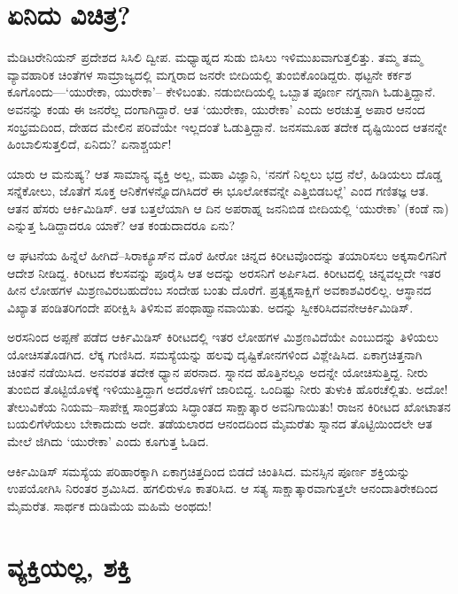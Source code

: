 \section*{ಏನಿದು ವಿಚಿತ್ರ?}


ಮೆಡಿಟರೇನಿಯನ್ ಪ್ರದೇಶದ ಸಿಸಿಲಿ ದ್ವೀಪ. ಮಧ್ಯಾಹ್ನದ ಸುಡು ಬಿಸಿಲು ಇಳಿಮುಖವಾಗುತ್ತ\-ಲಿತ್ತು. ತಮ್ಮ ತಮ್ಮ ವ್ಯಾವಹಾರಿಕ ಚಿಂತೆಗಳ ಸಾಮ್ರಾಜ್ಯದಲ್ಲಿ ಮಗ್ನರಾದ ಜನರೇ ಬೀದಿಯಲ್ಲಿ ತುಂಬಿ\-ಕೊಂಡಿದ್ದರು. ಥಟ್ಟನೇ ಕರ್ಕಶ ಕೂಗೊಂದು—‘ಯುರೇಕಾ, ಯುರೇಕಾ’– ಕೇಳಿಬಂತು. ನಡುಬೀದಿಯಲ್ಲಿ ಒಬ್ಬಾತ ಪೂರ್ಣ ನಗ್ನನಾಗಿ ಓಡುತ್ತಿದ್ದಾನೆ. ಅವನನ್ನು ಕಂಡು ಈ ಜನರೆಲ್ಲ ದಂಗಾಗಿದ್ದಾರೆ. ಆತ ‘ಯುರೇಕಾ, ಯುರೇಕಾ’ ಎಂದು ಅರಚುತ್ತ ಅಪಾರ ಆನಂದ ಸಂಭ್ರಮದಿಂದ, ದೇಹದ ಮೇಲಿನ ಪರಿವೆಯೇ ಇಲ್ಲದಂತೆ ಓಡುತ್ತಿದ್ದಾನೆ. ಜನಸಮೂಹ ತದೇಕ ದೃಷ್ಟಿಯಿಂದ ಆತನನ್ನೇ ಹಿಂಬಾಲಿಸುತ್ತಲಿದೆ, ಏನಿದು? ಏನಾಶ್ಚರ್ಯ!

ಯಾರು ಆ ಮನುಷ್ಯ? ಆತ ಸಾಮಾನ್ಯ ವ್ಯಕ್ತಿ ಅಲ್ಲ, ಮಹಾ ವಿಜ್ಞಾನಿ, ‘ನನಗೆ ನಿಲ್ಲಲು ಭದ್ರ ನೆಲೆ, ಹಿಡಿಯಲು ದೊಡ್ಡ ಸನ್ನೆಕೋಲು, ಜೊತೆಗೆ ಸೂಕ್ತ ಆನಿಕೆಗಳನ್ನೊದಗಿಸಿದರೆ ಈ ಭೂಲೋಕವನ್ನೇ ಎತ್ತಿಬಿಡಬಲ್ಲೆ’ ಎಂದ ಗಣಿತಜ್ಞ ಆತ. ಆತನ ಹೆಸರು ಆರ್ಕಿಮಿಡಿಸ್. ಆತ ಬತ್ತಲೆಯಾಗಿ ಆ ದಿನ ಅಪರಾಹ್ನ ಜನನಿಬಿಡ ಬೀದಿಯಲ್ಲಿ ‘ಯುರೇಕಾ’ (ಕಂಡೆ ನಾ) ಎನ್ನುತ್ತ ಓಡಿದ್ದಾದರೂ ಯಾಕೆ? ಆತ ಕಂಡುದಾದರೂ ಏನು?

ಆ ಘಟನೆಯ ಹಿನ್ನೆಲೆ ಹೀಗಿದೆ–ಸಿರಾಕ್ಯೂಸ್​ನ ದೊರೆ ಹೀರೋ ಚಿನ್ನದ ಕಿರೀಟವೊಂದನ್ನು ತಯಾರಿಸಲು ಅಕ್ಕಸಾಲಿಗನಿಗೆ ಆದೇಶ ನೀಡಿದ್ದ. ಕಿರೀಟದ ಕೆಲಸವನ್ನು ಪೂರೈಸಿ ಆತ ಅದನ್ನು ಅರಸನಿಗೆ ಅರ್ಪಿಸಿದ. ಕಿರೀಟದಲ್ಲಿ ಚಿನ್ನವಲ್ಲದೇ ಇತರ ಹೀನ ಲೋಹಗಳ ಮಿಶ್ರಣ\-ವಿರ\-ಬಹುದೆಂಬ ಸಂದೇಹ ಬಂತು ದೊರೆಗೆ. ಪ್ರತ್ಯಕ್ಷಸಾಕ್ಷಿಗೆ ಅವಕಾಶವಿರಲಿಲ್ಲ. ಆಸ್ಥಾನದ ವಿಖ್ಯಾತ ಪಂಡಿತರಿಗಂದೇ ಪರೀಕ್ಷಿಸಿ ತಿಳಿಸುವ ಪಂಥಾಹ್ವಾನವಾಯಿತು. ಅದನ್ನು ಸ್ವೀಕರಿಸಿದವನೇ\break ಆರ್ಕಿಮಿಡಿಸ್.

ಅರಸನಿಂದ ಅಪ್ಪಣೆ ಪಡೆದ ಆರ್ಕಿಮಿಡಿಸ್ ಕಿರೀಟದಲ್ಲಿ ಇತರ ಲೋಹಗಳ ಮಿಶ್ರಣವಿದೆಯೇ ಎಂಬುದನ್ನು ತಿಳಿಯಲು ಯೋಚಿಸತೊಡಗಿದ. ಲೆಕ್ಕ ಗುಣಿಸಿದ. ಸಮಸ್ಯೆಯನ್ನು ಹಲವು ದೃಷ್ಟಿಕೋನಗಳಿಂದ ವಿಶ್ಲೇಷಿಸಿದ. ಏಕಾಗ್ರಚಿತ್ತನಾಗಿ ಚಿಂತನೆ ನಡೆಯಿಸಿದ. ಅನವರತ ತದೇಕ ಧ್ಯಾನ ಪರನಾದ. ಸ್ನಾನದ ಹೊತ್ತಿನಲ್ಲೂ ಅದನ್ನೇ ಯೋಚಿಸುತ್ತಿದ್ದ. ನೀರು ತುಂಬಿದ ತೊಟ್ಟಿಯೊಳಕ್ಕೆ ಇಳಿಯುತ್ತಿದ್ದಾಗ ಅದರೊಳಗೆ ಜಾರಿಬಿದ್ದ. ಒಂದಿಷ್ಟು ನೀರು ತುಳುಕಿ ಹೊರಚೆಲ್ಲಿತು. ಅದೋ! ತೇಲುವಿಕೆಯ ನಿಯಮ–ಸಾಪೇಕ್ಷ ಸಾಂದ್ರತೆಯ ಸಿದ್ಧಾಂತದ ಸಾಕ್ಷಾತ್ಕಾರ ಅವನಿಗಾಯಿತು! ರಾಜನ ಕಿರೀಟದ ಖೋಟಾತನ ಬಯಲಿಗೆಳೆಯಲು ಬೇಕಾದುದು ಅದೇ. ತಡೆಯಲಾರದ ಆನಂದದಿಂದ ಮೈಮರೆತು ಸ್ನಾನದ ತೊಟ್ಟಿಯಿಂದಲೇ ಆತ ಮೇಲೆ ಜಿಗಿದು ‘ಯುರೇಕಾ’ ಎಂದು ಕೂಗುತ್ತ ಓಡಿದ.

ಆರ್ಕಿಮಿಡಿಸ್ ಸಮಸ್ಯೆಯ ಪರಿಹಾರಕ್ಕಾಗಿ ಏಕಾಗ್ರಚಿತ್ತದಿಂದ ಬಿಡದೆ ಚಿಂತಿಸಿದ. ಮನಸ್ಸಿನ ಪೂರ್ಣ ಶಕ್ತಿಯನ್ನು ಉಪಯೋಗಿಸಿ ನಿರಂತರ ಶ್ರಮಿಸಿದ. ಹಗಲಿರುಳೂ ಕಾತರಿಸಿದ. ಆ ಸತ್ಯ ಸಾಕ್ಷಾತ್ಕಾರವಾಗುತ್ತಲೇ ಆನಂದಾತಿರೇಕದಿಂದ ಮೈಮರೆತ. ಸಾರ್ಥಕ ದುಡಿಮೆಯ ಮಹಿಮೆ ಅಂಥದು!


\section*{ವ್ಯಕ್ತಿಯಲ್ಲ, ಶಕ್ತಿ}

